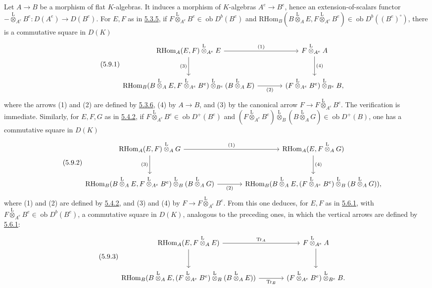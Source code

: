 \documentclass[11pt]{article}
\newcommand{\ob}{\operatorname{ob}}
\providecommand{\RHom}{\mathrm{RHom}}
\providecommand{\Tr}{\operatorname{Tr}}
\providecommand{\Tr}{\operatorname{Tr}}
\providecommand{\lten}{\overset{\mathrm L}{\otimes}}
\providecommand{\Tr}{\operatorname{Tr}}
\providecommand{\RHom}{\mathrm{RHom}}
\providecommand{\ob}{\operatorname{ob}}
\providecommand{\lten}{\overset{\mathrm L}{\otimes}}
\providecommand{\RHom}{\mathrm R\mathcal{H}om}
\providecommand{\lten}{\overset{\mathrm L}{\otimes}}
\providecommand{\Tr}{\operatorname{Tr}}
\providecommand{\lten}{\overset{\mathrm L}{\otimes}}
\providecommand{\lten}{\overset{\mathrm L}{\otimes}}
\providecommand{\lten}{\overset{\mathrm L}{\otimes}}
\providecommand{\RHom}{\mathrm{RHom}}
\providecommand{\Tr}{\operatorname{Tr}}
\providecommand{\lten}{\overset{\mathrm L}{\otimes}}
\begin{document}
Let $A\to B$ be a morphism of flat $K$-algebras. It induces a morphism of $K$-algebras $A^e\to B^e$, hence an extension-of-scalars functor $-\lten_{A^e}B^e:D(A^e)\longrightarrow D(B^e)$.
For $E,F$ as in \hyperref[sga5:IIIB:equation:5.3.5]{5.3.5}, if $F\lten_{A^e}B^e\in\ob D^b(B^e)$ and $\RHom_B(B\lten_AE,F\lten_{A^e}B^e)\in\ob D^b((B^e)^\circ)$, there is a commutative square in $D(K)$
\begin{equation}\tag{5.9.1}\label{sga5:IIIB:equation:5.9.1}
\begin{tikzcd}[column sep=large,row sep=large]
\RHom_A(E,F)\lten_{A^e}E \arrow[r,"(1)"] \arrow[d,"(3)"'] & F\lten_{A^e}A \arrow[d,"(4)"]\\
\RHom_B(B\lten_AE,F\lten_{A^e}B^e)\lten_{B^e}(B\lten_AE) \arrow[r,"(2)"'] & (F\lten_{A^e}B^e)\lten_{B^e}B,
\end{tikzcd}
\end{equation}
where the arrows (1) and (2) are defined by \hyperref[sga5:IIIB:equation:5.3.6]{5.3.6}, (4) by $A\to B$, and (3) by the canonical arrow $F\to F\lten_{A^e}B^e$. The verification is immediate. Similarly, for $E,F,G$ as in \hyperref[sga5:IIIB:equation:5.4.2]{5.4.2}, if $F\lten_{A^e}B^e\in\ob D^+(B^e)$ and $(F\lten_{A^e}B^e)\lten_B(B\lten_AG)\in\ob D^+(B)$, one has a commutative square in $D(K)$
\begin{equation}\tag{5.9.2}\label{sga5:IIIB:equation:5.9.2}
\begin{tikzcd}[column sep=large,row sep=large]
\RHom_A(E,F)\lten_AG \arrow[r,"(1)"] \arrow[d,"(3)"'] & \RHom_A(E,F\lten_AG) \arrow[d,"(4)"]\\
\RHom_B(B\lten_AE,F\lten_{A^e}B^e)\lten_B(B\lten_AG) \arrow[r,"(2)"'] & \RHom_B(B\lten_AE,(F\lten_{A^e}B^e)\lten_B(B\lten_AG)),
\end{tikzcd}
\end{equation}
where (1) and (2) are defined by \hyperref[sga5:IIIB:equation:5.4.2]{5.4.2}, and (3) and (4) by $F\to F\lten_{A^e}B^e$. From this one deduces, for $E,F$ as in \hyperref[sga5:IIIB:equation:5.6.1]{5.6.1}, with $F\lten_{A^e}B^e\in\ob D^b(B^e)$, a commutative square in $D(K)$, analogous to the preceding ones, in which the vertical arrows are defined by \hyperref[sga5:IIIB:equation:5.6.1]{5.6.1}:
\begin{equation}\tag{5.9.3}\label{sga5:IIIB:equation:5.9.3}
\begin{tikzcd}[column sep=large,row sep=large]
\RHom_A(E,F\lten_AE) \arrow[r,"\Tr_A"] \arrow[d] & F\lten_{A^e}A \arrow[d]\\
\RHom_B(B\lten_AE,(F\lten_{A^e}B^e)\lten_B(B\lten_AE)) \arrow[r,"\Tr_B"'] & (F\lten_{A^e}B^e)\lten_{B^e}B.
\end{tikzcd}
\end{equation}
\end{document}
